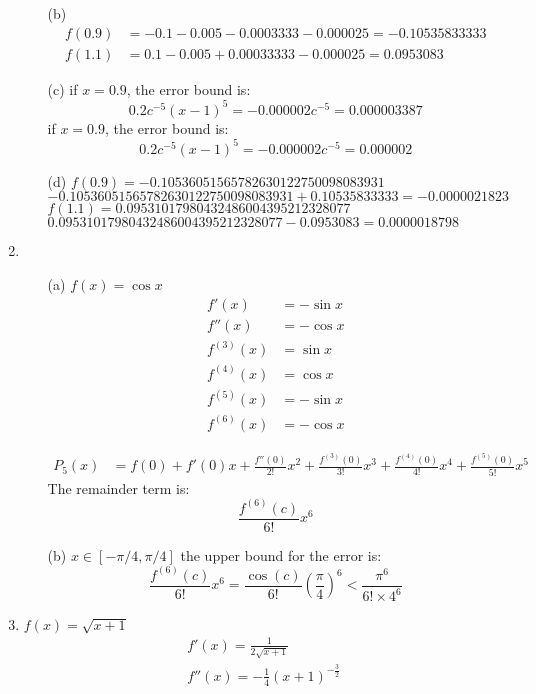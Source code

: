 \documentclass[UTF8]{ctexart}
\begin{document}
\begin{enumerate}
\begin{itemize}
\item[(b)]
\begin{align*}
f(0.9) &= -0.1 - 0.005 - 0.0003333 - 0.000025 = -0.10535833333\\
f(1.1) &= 0.1 - 0.005 + 0.00033333 - 0.000025 = 0.0953083
\end{align*}

\item[(c)]
if $x = 0.9$, the error bound is:
\[
	0.2c^{-5}(x - 1)^5 = -0.000002c^{-5} = 0.000003387
\]
if $x = 0.9$, the error bound is:
\[
	0.2c^{-5}(x - 1)^5 = -0.000002c^{-5} = 0.000002
\]

\item[(d)]
$f(0.9) = -0.10536051565782630122750098083931$ \\
$-0.10536051565782630122750098083931 + 0.10535833333 = -0.0000021823$ \\
$f(1.1) = 0.09531017980432486004395212328077$ \\
$0.09531017980432486004395212328077 - 0.0953083 = 0.0000018798$
\end{itemize}

\item \begin{itemize}
\item[(a)] $f(x) = \cos x$
\begin{align*}
f'(x) &= -\sin x \\
f''(x) &= -\cos x \\
f^{(3)}(x) &= \sin x \\
f^{(4)}(x) &= \cos x \\
f^{(5)}(x) &= -\sin x \\
f^{(6)}(x) &= -\cos x
\end{align*}

\begin{align*}
P_5(x) &= f(0) + f'(0)x + \frac{f''(0)}{2!}x^2 + \frac{f^{(3)}(0)}{3!}x^3 + \frac{f^{(4)}(0)}{4!}x^4 + \frac{f^{(5)}(0)}{5!}x^5
\end{align*}
The remainder term is:
\[
	\frac{f^{(6)}(c)}{6!}x^6
\]

\item[(b)] $x \in [-\pi/4, \pi/4]$
the upper bound for the error is: 
\[
	\frac{f^{(6)}(c)}{6!}x^6 = 	\frac{\cos(c)}{6!}(\frac{\pi}{4})^6	< \frac{\pi^6}{6! \times 4^6}
\]
\end{itemize}

\item $f(x) = \sqrt{x+1}$
\begin{align*}
	f'(x) = \frac{1}{2\sqrt{x+1}} \\
	f''(x) = -\frac{1}{4}(x+1)^{-\frac{3}{2}}
\end{align*}


\end{enumerate}
\end{document}
